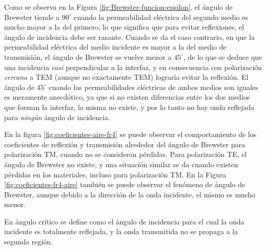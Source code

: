 Como se observa en la Figura \ref{fig:Brewster-funcion-epsilon}, el ángulo de Brewster tiende a $90^{\circ}$ cuando la permeabilidad eléctrica del segundo medio es mucho mayor a la del primero, lo que significa que para evitar reflexiones, el ángulo de incidencia debe ser rasante. Cuando se da el caso contrario, en que la permeabilidad eléctrica del medio incidente es mayor a la del medio de transmisión, el ángulo de Brewster se vuelve menor a $45^{\circ}$, de lo que se deduce que una incidencia \textit{casi} perpendicular a la interfaz, y en consecuencia con polarización \textit{cercana} a TEM (aunque no exactamente TEM) lograría evitar la reflexión. El ángulo de $45^{\circ}$ cuando las permeabilidades eléctricas de ambos medios son iguales es meramente anecdótico, ya que si no existen diferencias entre los dos medios que forman la interfaz, la misma no existe, y por lo tanto no hay onda reflejada para \textit{ningún} ángulo de incidencia.

\begin{figure} [H]
	\centering 
	\caption{}
	\label{fig:angulo-critico-epsilon}
\end{figure}

En la figura  \ref{fig:coeficientes-aire-fr4} se puede observar el comportamiento de los coeficientes de reflexión y transmisión alrededor del ángulo de Brewster para polarización TM, cuando no se consideran pérdidas. Para polarización TE, el ángulo de Brewster no existe, y una situación similar se da cuando existen pérdidas en los materiales, incluso para polarización TM. En la Figura \ref{fig:coeficientes-fr4-aire} también se puede observar el fenómeno de ángulo de Brewster, aunque debido a la dirección de la onda incidente, el mismo es mucho menor.


En ángulo crítico se define como el ángulo de incidencia para el cual la onda incidente es totalmente reflejada, y la onda transmitida no se propaga a la segunda región.

